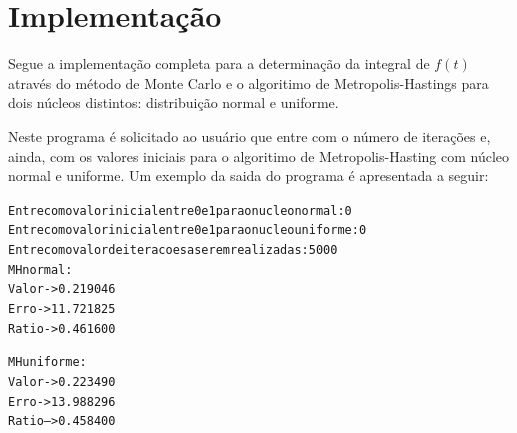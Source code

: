 \documentclass [a4paper,10pt]{article}
\begin{document}
	\section{Implementação}
		Segue a implementação completa para a determinação da integral de $f(t)$ através do método de Monte Carlo e
		o algoritimo de Metropolis-Hastings para dois núcleos distintos: distribuição normal e uniforme.
    	{\linespread{1.15}
    	}
		
		Neste programa é solicitado ao usuário que entre com o número de iterações
		e, ainda, com os valores iniciais para o algoritimo de Metropolis-Hasting
		com núcleo normal e uniforme. Um exemplo da saida do programa é apresentada a seguir:
		\begin{alltt}
			\indent Entre com o valor inicial entre 0 e 1 para o nucleo normal: 0
			\indent Entre com o valor inicial entre 0 e 1 para o nucleo uniforme: 0
			\indent Entre com o valor de iteracoes a serem realizadas: 5000
			\indent MH normal:
			\hspace{10mm}Valor -> 0.219046
			\hspace{10mm}Erro -> 11.721825%
			\hspace{10mm}Ratio -> 0.461600

			\indent MH uniforme:
			\hspace{10mm}Valor -> 0.223490
			\hspace{10mm}Erro -> 13.988296%
			\hspace{10mm}Ratio --> 0.458400
		\end{alltt}
\end{document}
